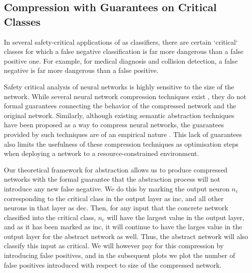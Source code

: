 \subsection{Compression with Guarantees on Critical Classes}
\label{s:exp-mnist-comp}


In several safety-critical applications of \dnn as classifiers, there are
certain `critical` classes for which a false negative classification is far more
dangerous than a false positive one. For example, for medical diagnosis and
collision detection, a false negative is far more dangerous than a false
positive.

Safety critical analysis of neural networks is highly sensitive to the size of
the network. While several neural network compression techniques exist 
\cite{dnn-compression}, they do not formal guarantees 
connecting the behavior of the compressed network and the original network. Similarly,
although existing semantic abstraction techniques have been proposed as 
a way to compress neural networks, the guarantees provided by such 
techniques are of an empirical nature \cite{lin-comb-abs-jan}.
This lack of guarantees also limits the usefulness of these compression
techniques as optimisation steps when deploying a network to a
resource-constrained environment. 

Our theoretical framework for abstraction allows us to produce compressed
networks with the formal guarantee that the abstraction process will not
introduce any new false negative. We do this by marking the output neuron $n_c$
corresponding to the critical class in the output layer as inc, and all other
neurons in that layer as dec.  Then, for any input that the concrete network
classified into the critical class, $n_c$ will have the largest value in the
output layer, and as it has been marked as inc, it will continue to have the
larges value in the output layer for the abstract network as well. Thus, the
abstract network will also classify this input as critical. We will however pay
for this compression by introducing false positives, and in the subsequent plots
we plot the number of false positives introduced with respect to size of the
compressed network.

